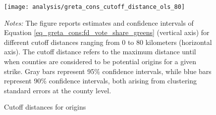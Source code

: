 \begin{figure}[H]\centering
	\texttt{[image: analysis/greta\_cons\_cutoff\_distance\_ols\_80]}
	\begin{minipage}{0.9\linewidth}
		\caption{Cutoff distances for origins}\label{fig_greta_cons:origin_cutoff_distances}
		\scriptsize{\emph{Notes:} The figure reports estimates and confidence intervals of Equation \ref{eq_greta_cons:fd_vote_share_greens} (vertical axis) for different cutoff distances ranging from 0 to 80 kilometers (horizontal axis). The cutoff distance refers to the maximum distance until when counties are considered to be potential origins for a given strike. Gray bars represent 95\% confidence intervals, while blue bars represent 90\% confidence intervals, both arising from clustering standard errors at the county level.}
	\end{minipage}
\end{figure}




